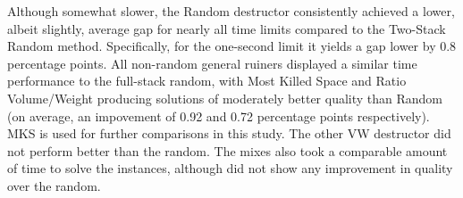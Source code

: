 \documentclass[preprint,12pt,3p]{elsarticle}
\begin{document}
Although somewhat slower, the Random destructor consistently achieved a lower, albeit slightly, average gap for nearly all time limits compared to the Two-Stack Random method. Specifically, for the one-second limit it yields a gap lower by 0.8 percentage points. All non-random general ruiners displayed a similar time performance to the full-stack random, with Most Killed Space and Ratio Volume/Weight producing solutions of moderately better quality than Random (on average, an impovement of 0.92 and 0.72 percentage points respectively). MKS is used for further comparisons in this study. The other VW destructor did not perform better than the random. The mixes also took a comparable amount of time to solve the instances, although did not show any improvement in quality over the random.

\begin{table}[ht]
\centering
{}
\end{table}
\end{document}
